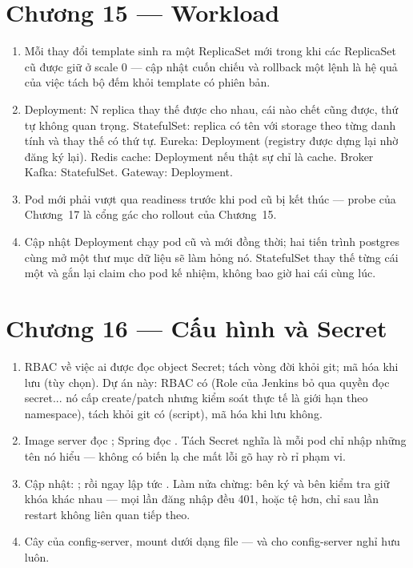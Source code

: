 \section*{Chương 15 --- Workload}
\begin{enumerate}
  \item Mỗi thay đổi template sinh ra một ReplicaSet mới trong khi các
  ReplicaSet cũ được giữ ở scale 0 --- cập nhật cuốn chiếu và rollback
  một lệnh là hệ quả của việc tách bộ đếm khỏi template có phiên bản.
  \item Deployment: N replica thay thế được cho nhau, cái nào chết
  cũng được, thứ tự không quan trọng. StatefulSet: replica có tên với
  storage theo từng danh tính và thay thế có thứ tự. Eureka: Deployment
  (registry được dựng lại nhờ đăng ký lại). Redis cache: Deployment
  nếu thật sự chỉ là cache. Broker Kafka: StatefulSet. Gateway:
  Deployment.
  \item Pod mới phải vượt qua readiness trước khi pod cũ bị kết thúc
  --- probe của Chương~17 là cổng gác cho rollout của Chương~15.
  \item Cập nhật Deployment chạy pod cũ và mới đồng thời; hai tiến
  trình postgres cùng mở một thư mục dữ liệu sẽ làm hỏng nó.
  StatefulSet thay thế từng cái một và gắn lại claim cho pod kế nhiệm,
  không bao giờ hai cái cùng lúc.
\end{enumerate}

\section*{Chương 16 --- Cấu hình và Secret}
\begin{enumerate}
  \item RBAC về việc ai được đọc object Secret; tách vòng đời khỏi git;
  mã hóa khi lưu (tùy chọn). Dự án này: RBAC có (Role của Jenkins bỏ
  qua quyền đọc secret... nó cấp create/patch nhưng kiểm soát thực tế
  là giới hạn theo namespace), tách khỏi git có (script), mã hóa khi
  lưu không.
  \item Image server đọc ; Spring đọc
  . Tách Secret nghĩa là mỗi pod chỉ nhập
  những tên nó hiểu --- không có biến lạ che mất lỗi gõ hay rò rỉ
  phạm vi.
  \item Cập nhật: ; rồi ngay
  lập tức . Làm nửa chừng: bên ký và bên kiểm tra giữ
  khóa khác nhau --- mọi lần đăng nhập đều 401, hoặc tệ hơn, chỉ sau
  lần restart không liên quan tiếp theo.
  \item Cây  của config-server, mount dưới
  dạng file --- và cho config-server nghỉ hưu luôn.
\end{enumerate}


